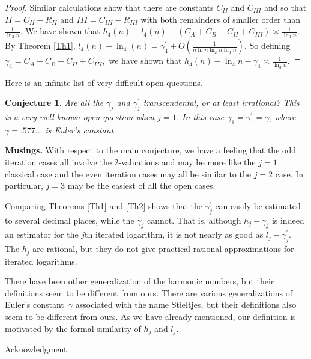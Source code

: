\documentclass{article}
\theoremstyle{theorem}
\newtheorem{conjecture}[theorem]{Conjecture}
\theoremstyle{definition}
\begin{document}
\begin{proof}
Similar calculations show that there are constants $C_{II}$ and $C_{III}$
and so that $II=C_{II}-R_{II}$ and $III=C_{III}-R_{III}$ with both
remainders of smaller order than $\frac{1}{\ln _{3}n}.$ We have shown that $%
h_{4}\left( n\right) -l_{4}\left( n\right) -\left(
C_{A}+C_{B}+C_{II}+C_{III}\right) \asymp \frac{1}{\ln _{3}n}$. By Theorem %
\ref{Th1}, $l_{4}(n)-\ln _{4}\left( n\right) =\gamma _{4}^{\prime }+O\left( 
\frac{1}{n\ln n\ln _{2}n\ln _{3}n}\right) .$ So defining $\gamma
_{4}=C_{A}+C_{B}+C_{II}+C_{III},$ we have shown that $h_{4}\left( n\right)
-\ln _{4}n-\gamma _{4}\asymp \frac{1}{\ln _{3}n}.$
\end{proof}

Here is an infinite list of very difficult open questions.

\begin{conjecture}
Are all the $\gamma _{j}$ and $\gamma _{j}^{\prime }$ transcendental, or at
least irrational? This is a very well known open question when $j=1$. In
this case $\gamma _{1}=\gamma _{1}^{\prime }=\gamma $, where $\gamma
=.577... $ is Euler's constant.
\end{conjecture}

\textbf{Musings.} With respect to the main conjecture, we have a feeling
that the odd iteration cases all involve the 2-valuations and may be more
like the $j=1$ classical case and the even iteration cases may all be
similar to the $j=2$ case. In particular, $j=3$ may be the easiest of all
the open cases.

Comparing Theorems \ref{Th1} and \ref{Th2} shows that the $\gamma
_{j}^{\prime }$ can easily be estimated to several decimal places, while the 
$\gamma _{j}$ cannot. That is, although $h_{j}-\gamma _{j}$ is indeed an
estimator for the $j$th iterated logarithm, it is not nearly as good as $%
l_{j}-\gamma _{j}^{\prime }.$ The $h_{j}$ are rational, but they do not give
practical rational approximations for iterated logarithms.

There have been other generalization of the harmonic numbers, but their
definitions seem to be different from ours. There are various
generalizations of Euler's constant~$\gamma $ associated with the name
Stieltjes, but their definitions also seem to be different from ours. As we
have already mentioned, our definition is motivated by the formal similarity
of $h_{j}$ and $l_{j}.$



\begin{acknowledgment}{Acknowledgment.}
\end{acknowledgment}
\end{document}
